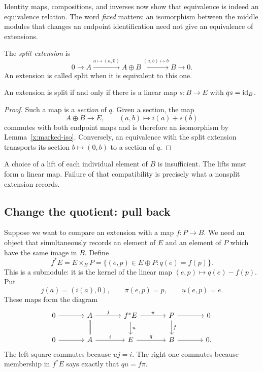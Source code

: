 Identity maps, compositions, and inverses now show that equivalence is
indeed an equivalence relation. The word \emph{fixed} matters: an
isomorphism between the middle modules that changes an endpoint
identification need not give an equivalence of extensions.

The \emph{split extension} is
\[
0\longrightarrow A\xrightarrow{a\mapsto(a,0)}A\oplus B
 \xrightarrow{(a,b)\mapsto b}B\longrightarrow0.
\]
An extension is called split when it is equivalent to this one.

\begin{proposition}\label{x:splitting}
An extension is split if and only if there is a linear map $s:B\to E$
with $qs=\mathrm{id}_B$.
\end{proposition}
\begin{proof}
Such a map is a \emph{section} of $q$. Given a section, the map
\[
A\oplus B\longrightarrow E,\qquad (a,b)\longmapsto i(a)+s(b)
\]
commutes with both endpoint maps and is therefore an isomorphism by
Lemma~\ref{x:marked-iso}. Conversely, an equivalence with the split
extension transports its section $b\mapsto(0,b)$ to a section of $q$.
\end{proof}

A choice of a lift of each individual element of $B$ is insufficient.
The lifts must form a linear map. Failure of that compatibility is
precisely what a nonsplit extension records.

\subsection{Change the quotient: pull back}

Suppose we want to compare an extension with a map $f:P\to B$. We need
an object that simultaneously records an element of $E$ and an element
of $P$ which have the same image in $B$. Define
\[
f^*E=E\times_B P
 =\{(e,p)\in E\oplus P:q(e)=f(p)\}.
\]
This is a submodule: it is the kernel of the linear map
$(e,p)\mapsto q(e)-f(p)$. Put
\[
j(a)=(i(a),0),\qquad \pi(e,p)=p,\qquad u(e,p)=e.
\]
These maps form the diagram
\[
\begin{tikzcd}[column sep=large]
0\arrow[r]&A\arrow[r,"j"]\arrow[d,equal]
 &f^*E\arrow[r,"\pi"]\arrow[d,"u"]&P\arrow[r]\arrow[d,"f"]&0\\
0\arrow[r]&A\arrow[r,"i"]&E\arrow[r,"q"]&B\arrow[r]&0.
\end{tikzcd}
\]
The left square commutes because $uj=i$. The right one commutes because
membership in $f^*E$ says exactly that $qu=f\pi$.


